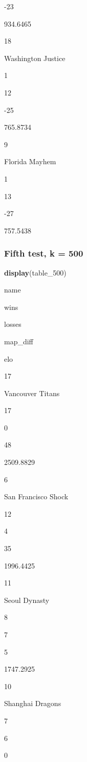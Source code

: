 \documentclass[]{article}
\newenvironment{Shaded}{\begin{snugshade}}{\end{snugshade}}
\newcommand{\KeywordTok}[1]{\textcolor[rgb]{0.13,0.29,0.53}{\textbf{#1}}}
\newcommand{\DecValTok}[1]{\textcolor[rgb]{0.00,0.00,0.81}{#1}}
\newcommand{\NormalTok}[1]{#1}
\begin{document}
{-23}

{934.6465}

18

Washington Justice

1

12

{-25}

{765.8734}

9

Florida Mayhem

1

13

{-27}

{757.5438}

\subsubsection{Fifth test, k = 500}\label{fifth-test-k-500}

\begin{Shaded}
\begin{Highlighting}[]
\KeywordTok{display}\NormalTok{(table_}\DecValTok{500}\NormalTok{)}
\end{Highlighting}
\end{Shaded}

name

wins

losses

map\_diff

elo

17

Vancouver Titans

17

0

{48}

{2509.8829}

6

San Francisco Shock

12

4

{35}

{1996.4425}

11

Seoul Dynasty

8

7

{5}

{1747.2925}

10

Shanghai Dragons

7

6

{0}
\end{document}
